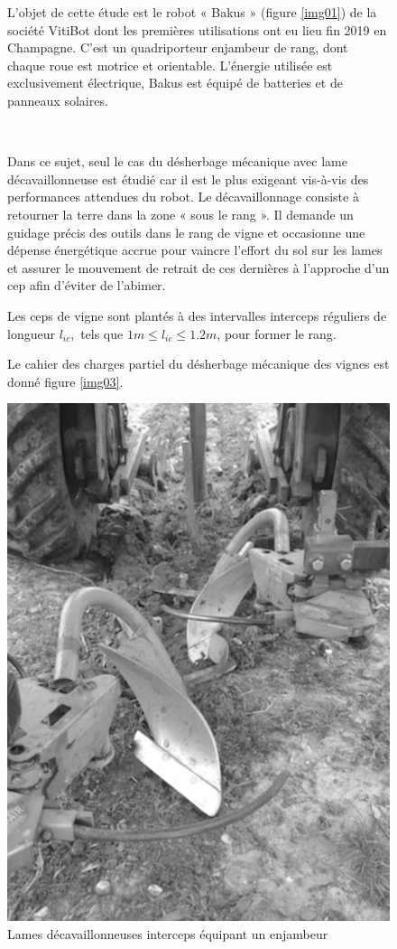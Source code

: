 \begin{figure}[!h]
\begin{minipage}{0.65\linewidth}
L'objet de cette étude est le robot « Bakus » (figure \ref{img01}) de la
société VitiBot dont les premières utilisations ont eu lieu fin 2019 en Champagne. C'est un quadriporteur enjambeur de rang, dont chaque roue est motrice et orientable. L'énergie utilisée est exclusivement électrique, Bakus est équipé de batteries et de panneaux solaires.

~\

Dans ce sujet, seul le cas du désherbage mécanique avec lame décavaillonneuse est étudié car il est le plus exigeant vis-à-vis des
performances attendues du robot. Le décavaillonnage consiste à retourner la terre dans la zone « sous le rang ». Il demande un guidage précis des outils dans le rang de vigne et occasionne une dépense énergétique accrue pour vaincre l'effort du sol sur les lames et assurer le mouvement de retrait de ces dernières à l'approche d'un cep afin d'éviter de l'abimer.

Les ceps de vigne sont plantés à des intervalles interceps réguliers de longueur $l_{ic},$ tels que $1m\leq l_{ic}\leq 1.2m$, pour former le rang.

Le cahier des charges partiel du désherbage mécanique des vignes
est donné figure \ref{img03}.
\end{minipage}\hfill
\begin{minipage}{0.3\linewidth}
\centering\includegraphics[width=0.95\linewidth]{img/fig02}
 \caption{Lames décavaillonneuses interceps équipant un enjambeur}
 \label{img02}
\end{minipage}
\end{figure}

